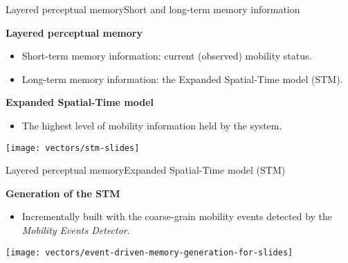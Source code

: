 
\begin{frame}{Layered perceptual memory}{Short and long-term memory information}
\vspace{-0.25cm}
\small
\begin{block}{\small \textbf{Layered perceptual memory}}
\begin{itemize}
    \item Short-term memory information: current (observed) mobility status.
    \item Long-term memory information: the Expanded Spatial-Time model (STM).
\end{itemize}
\end{block}

\begin{block}{\small \textbf{Expanded Spatial-Time model}}
\begin{itemize}
  \item The highest level of mobility information held by the system.
\end{itemize}
{
  \centering
  \texttt{[image: vectors/stm-slides]}
\par }
\end{block}
\end{frame}

\begin{frame}{Layered perceptual memory}{Expanded Spatial-Time model (STM)}
\small
\begin{block}{\small \textbf{Generation of the STM}}
\begin{itemize}
    \item Incrementally built with the coarse-grain mobility events detected by the \emph{Mobility Events Detector}.
\end{itemize}
{
  \centering
  \texttt{[image: vectors/event-driven-memory-generation-for-slides]}
  \par
}
\end{block}
\end{frame}

